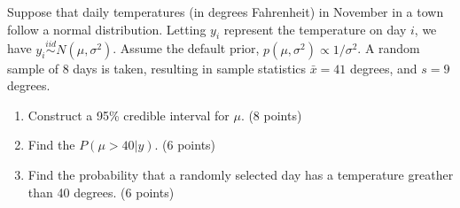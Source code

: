   \item 
Suppose that daily temperatures (in degrees Fahrenheit) in November in a town follow a normal distribution. Letting $y_i$ represent the temperature on day $i$, we have $y_i\stackrel{iid}{\sim}N(\mu, \sigma^2)$. Assume the default prior, $p(\mu, \sigma^2)\propto 1/\sigma^2$. A random sample of 8 days is taken, resulting in sample statistics $\bar{x}=41$ degrees, and $s=9$ degrees. 
 
     
    \begin{enumerate}
      \item Construct a 95\% credible interval for $\mu$.  (8 points)
      
    
    \vfill
      \item Find the $P(\mu>40|y)$. (6 points)
      
         \vfill  
         
     \item Find the probability that a randomly selected day has a temperature greather than 40 degrees. (6 points) \\
   
     
\end{enumerate}
\vfill